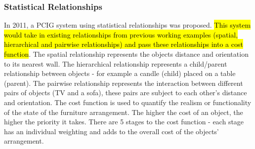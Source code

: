 \subsubsection{Statistical Relationships}
In 2011, a PCIG system using statistical relationships was proposed\cite{make-it-home}\cite{youtube:make-it-home}. \hl{This system would take in existing relationships from previous working examples (spatial, hierarchical and pairwise relationships) and pass these relationships into a cost function}. The spatial relationship represents the objects distance and orientation to its nearest wall. The hierarchical relationship represents a child/parent relationship between objects - for example a candle (child) placed on a table (parent). The pairwise relationship represents the interaction between different pairs of objects (TV and a sofa), these pairs are subject to each other's distance and orientation.
The cost function is used to quantify the realism or functionality of the state of the furniture arrangement. The higher the cost of an object, the higher the priority it takes. 
There are 5 stages to the cost function - each stage has an individual weighting and adds to the overall cost of the objects' arrangement.
